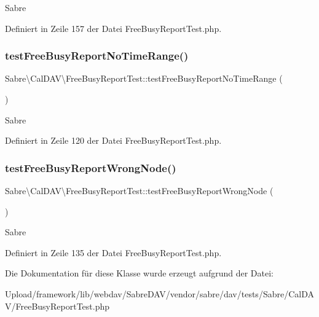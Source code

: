 Sabre 

Definiert in Zeile 157 der Datei Free\+Busy\+Report\+Test.\+php.

\mbox{\label{class_sabre_1_1_cal_d_a_v_1_1_free_busy_report_test_a95015cd1ec70a78d90615b42267ffa7d}} 
\subsubsection{\texorpdfstring{test\+Free\+Busy\+Report\+No\+Time\+Range()}{testFreeBusyReportNoTimeRange()}}
{\footnotesize\ttfamily Sabre\textbackslash{}\+Cal\+D\+A\+V\textbackslash{}\+Free\+Busy\+Report\+Test\+::test\+Free\+Busy\+Report\+No\+Time\+Range (\begin{DoxyParamCaption}{ }\end{DoxyParamCaption})}

Sabre 

Definiert in Zeile 120 der Datei Free\+Busy\+Report\+Test.\+php.

\mbox{\label{class_sabre_1_1_cal_d_a_v_1_1_free_busy_report_test_ad692d9e68cbc6e141bc7436d6dcc3798}} 
\subsubsection{\texorpdfstring{test\+Free\+Busy\+Report\+Wrong\+Node()}{testFreeBusyReportWrongNode()}}
{\footnotesize\ttfamily Sabre\textbackslash{}\+Cal\+D\+A\+V\textbackslash{}\+Free\+Busy\+Report\+Test\+::test\+Free\+Busy\+Report\+Wrong\+Node (\begin{DoxyParamCaption}{ }\end{DoxyParamCaption})}

Sabre 

Definiert in Zeile 135 der Datei Free\+Busy\+Report\+Test.\+php.



Die Dokumentation für diese Klasse wurde erzeugt aufgrund der Datei\+:\begin{DoxyCompactItemize}
\item 
Upload/framework/lib/webdav/\+Sabre\+D\+A\+V/vendor/sabre/dav/tests/\+Sabre/\+Cal\+D\+A\+V/Free\+Busy\+Report\+Test.\+php\end{DoxyCompactItemize}
